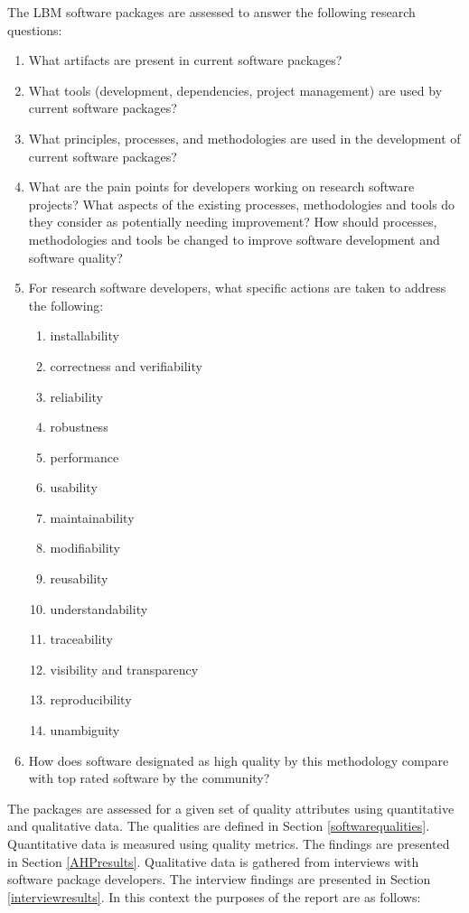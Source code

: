 \documentclass[12pt, notitlepage]{article}
\begin{document}
The LBM software packages are assessed to answer the following research questions:

\begin{enumerate}
	\item What artifacts are present in current software packages? 
	\item What tools (development, dependencies, project management) are used by current software packages?
	\item What principles, processes, and methodologies are used in the development
	of current software packages?
	\item What are the pain points for developers working on research software
	projects?  What aspects of the existing processes, methodologies and tools do
	they consider as potentially needing improvement?  How should processes,
	methodologies and tools be changed to improve software development and
	software quality?
	\item For research software developers, what specific actions are taken to
	address the following:
	\begin{enumerate}
		\item installability
		\item correctness and verifiability
		\item reliability
		\item robustness
		\item performance
		\item usability
		\item maintainability
		\item modifiability
		\item reusability
		\item understandability
		\item traceability
		\item visibility and transparency
		\item reproducibility
		\item unambiguity
	\end{enumerate} 
	\item How does software designated as high quality by this methodology compare	with top rated software by the community?
\end{enumerate}

The packages are assessed for a given set of quality attributes using quantitative and qualitative data. The qualities are defined in Section \ref{softwarequalities}. Quantitative data is measured using quality metrics. The findings are presented in Section \ref{AHPresults}. Qualitative data is gathered from interviews with software package developers. The interview findings are presented in Section \ref{interviewresults}. In this context the purposes of the report are as follows:
\end{document}
